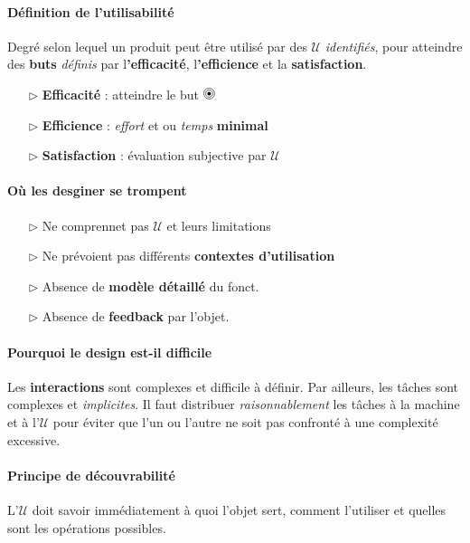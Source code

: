 \documentclass{report}
\newcommand{\target}{%
  \begin{tikzpicture}[scale=0.5]
    \fill[black] (0,0) circle (0.1);
    \draw (0,0) circle (0.2);
    \draw (0,0) circle (0.3);
  \end{tikzpicture}%
}
\begin{document}
\begin{multicols*}{3}
    \paragraph{Définition de l'utilisabilité}
    Degré selon lequel un produit peut être utilisé par des 
    $\mathcal{U}$ \textit{identifiés}, pour atteindre des 
    \textbf{buts} \textit{définis} par 
    l\textbf{'efficacité}, l\textbf{'efficience} et 
    la \textbf{satisfaction}.   
    \begin{itemize}
        \item [$\rhd $] \textbf{ Efficacité} : atteindre le but \;  $\target$
        \item [$\rhd $] \textbf{ Efficience} : \textit{effort} 
            et ou \textit{temps} \textbf{minimal} \;  
        \item [$\rhd $] \textbf{ Satisfaction} :  
            évaluation subjective par $\mathcal{U}$
    \end{itemize}

    \paragraph{Où les desginer se trompent}  
    \begin{itemize}
      \item [$\rhd $] Ne comprennet pas $\mathcal{U}$ et leurs limitations
      \item [$\rhd $] Ne prévoient pas différents \textbf{contextes d'utilisation}  
      \item [$\rhd $] Absence de \textbf{modèle détaillé} du fonct.        
      \item [$\rhd $] Absence de \textbf{feedback} par l'objet.        
    \end{itemize}

    \paragraph{Pourquoi le design est-il difficile}
    Les \textbf{interactions} sont complexes et difficile à définir. Par ailleurs, les tâches 
    sont complexes et \textit{implicites}. Il faut distribuer \textit{raisonnablement}
    les tâches à la machine et à l'$\mathcal{U}$ pour éviter que l'un ou l'autre 
    ne soit pas confronté à une complexité excessive. 

    \paragraph{Principe de découvrabilité}
    L'$\mathcal{U}$ doit savoir immédiatement à quoi l'objet sert, comment 
    l'utiliser et quelles sont les opérations possibles. 


\end{multicols*}
\end{document}

